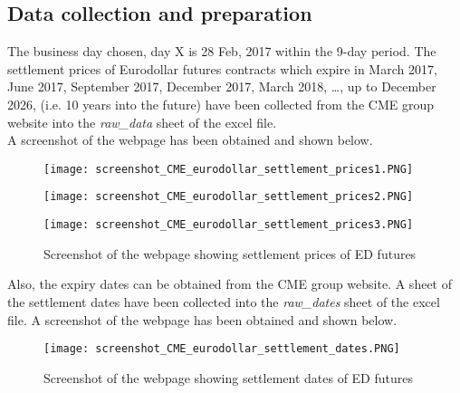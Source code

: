 \subsection{Data collection and preparation}
The business day chosen, day X is 28 Feb, 2017 within the 9-day period. The settlement prices of Eurodollar futures contracts which expire in March 2017, June 2017, September 2017, December 2017, March 2018, \dots , up to December 2026, (i.e. 10 years into the future) have been collected from the CME group website into the \emph{raw\_data} sheet of the excel file.\\
A screenshot of the webpage has been obtained and shown below.
\begin{figure}[h]
  \centering
  \begin{minipage}[h]{0.32\textwidth}
    \texttt{[image: screenshot\_CME\_eurodollar\_settlement\_prices1.PNG]}
  \end{minipage}
  \hfill
  \begin{minipage}[h]{0.32\textwidth}
    \texttt{[image: screenshot\_CME\_eurodollar\_settlement\_prices2.PNG]}
  \end{minipage}
  \hfill
  \begin{minipage}[h]{0.32\textwidth}
    \texttt{[image: screenshot\_CME\_eurodollar\_settlement\_prices3.PNG]}
  \end{minipage}
	\caption{Screenshot of the webpage showing settlement prices of ED futures}
\end{figure}

Also, the expiry dates can be obtained from the CME group website. A sheet of the settlement dates have been collected into the \emph{raw\_dates} sheet of the excel file. A screenshot of the webpage has been obtained and shown below.
\begin{figure}[h]
	\centering
	\texttt{[image: screenshot\_CME\_eurodollar\_settlement\_dates.PNG]}
	\caption{Screenshot of the webpage showing settlement dates of ED futures}
\end{figure}
\newpage

